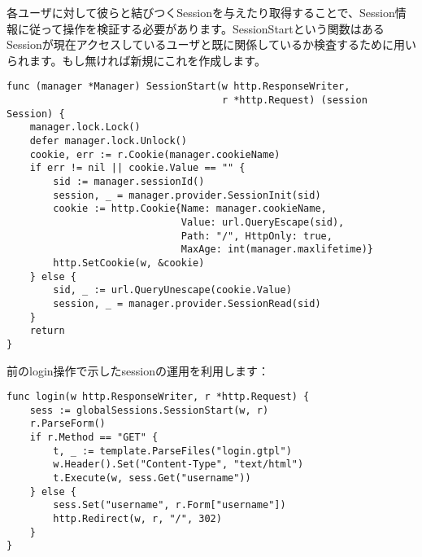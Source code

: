 各ユーザに対して彼らと結びつくSessionを与えたり取得することで、Session情報に従って操作を検証する必要があります。SessionStartという関数はあるSessionが現在アクセスしているユーザと既に関係しているか検査するために用いられます。もし無ければ新規にこれを作成します。

\begin{lstlisting}[numbers=none]
func (manager *Manager) SessionStart(w http.ResponseWriter,
                                     r *http.Request) (session Session) {
    manager.lock.Lock()
    defer manager.lock.Unlock()
    cookie, err := r.Cookie(manager.cookieName)
    if err != nil || cookie.Value == "" {
        sid := manager.sessionId()
        session, _ = manager.provider.SessionInit(sid)
        cookie := http.Cookie{Name: manager.cookieName,
                              Value: url.QueryEscape(sid),
                              Path: "/", HttpOnly: true,
                              MaxAge: int(manager.maxlifetime)}
        http.SetCookie(w, &cookie)
    } else {
        sid, _ := url.QueryUnescape(cookie.Value)
        session, _ = manager.provider.SessionRead(sid)
    }
    return
}
\end{lstlisting}

前のlogin操作で示したsessionの運用を利用します：

\begin{lstlisting}[numbers=none]
func login(w http.ResponseWriter, r *http.Request) {
    sess := globalSessions.SessionStart(w, r)
    r.ParseForm()
    if r.Method == "GET" {
        t, _ := template.ParseFiles("login.gtpl")
        w.Header().Set("Content-Type", "text/html")
        t.Execute(w, sess.Get("username"))
    } else {
        sess.Set("username", r.Form["username"])
        http.Redirect(w, r, "/", 302)
    }
}
\end{lstlisting}

